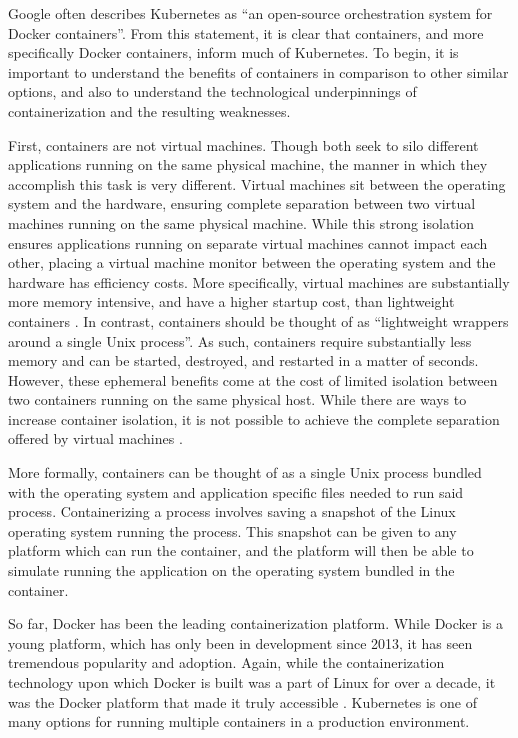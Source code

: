 Google often describes Kubernetes as ``an open-source orchestration system for
Docker containers''\cite{k8s-website}. From this statement, it is clear that
containers, and more specifically Docker containers, inform much of Kubernetes.
To begin, it is important to understand the benefits of containers in comparison
to other similar options, and also to understand the technological underpinnings
of containerization and the resulting weaknesses.

First, containers are not virtual machines. Though both seek to silo different
applications running on the same physical machine, the manner in which they
accomplish this task is very different. Virtual machines sit between the
operating system and the hardware, ensuring complete separation between two
virtual machines running on the same physical machine. While this strong
isolation ensures applications running on separate virtual machines cannot
impact each other, placing a virtual machine monitor between the operating
system and the hardware has efficiency costs. More specifically, virtual
machines are substantially more memory intensive, and have a higher startup cost,
than lightweight containers \cite{distributed-systems-principles-and-paradigms}.
In contrast, containers should be thought of as ``lightweight wrappers around a
single Unix process''\cite{docker-up-and-running}. As such, containers
require substantially less memory and can be started, destroyed, and restarted
in a matter of seconds. However, these ephemeral benefits come at the cost of
limited isolation between two containers running on the same physical host.
While there are ways to increase container isolation, it is not possible to
achieve the complete separation offered by virtual
machines \cite{docker-up-and-running}.

More formally, containers can be thought of as a single Unix process bundled
with the operating system and application specific files needed to run said process.
Containerizing a process involves saving a snapshot of the Linux operating system
running the process. This snapshot can be given to any platform which can run
the container, and the platform will then be able to simulate running the
application on the operating system bundled in the container.

So far, Docker has been the leading containerization platform. While Docker is a
young platform, which has only been in development since 2013, it has seen
tremendous popularity and adoption. Again, while the containerization technology
upon which Docker is built was a part of Linux for over a decade, it was the
Docker platform that made it truly accessible \cite{docker-up-and-running}.
Kubernetes is one of many options for running multiple containers in a
production environment.
